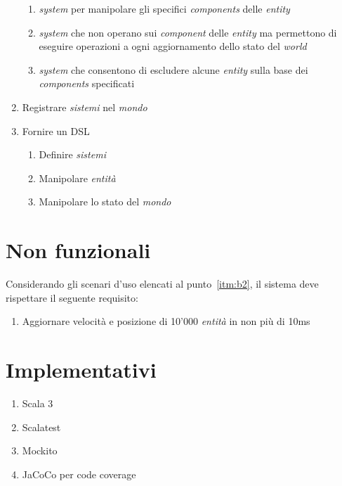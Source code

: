\begin{enumerate}[label=\textbf{\ref{sec:funzionali}.\arabic*}]
    \begin{enumerate}[label=\textbf{\ref{itm:f7}.\arabic*}]
        \item \label{itm:ff7} \textit{system} per manipolare gli specifici \textit{components} delle \textit{entity}
        \item \label{itm:ff10} \textit{system} che non operano sui \textit{component} delle \textit{entity} ma permettono di eseguire operazioni a ogni aggiornamento dello stato del \textit{world}
        \item \label{itm:ff11} \textit{system} che consentono di escludere alcune \textit{entity} sulla base dei \textit{components} specificati
    \end{enumerate}
    \item \label{itm:f8} Registrare \textit{sistemi} nel \textit{mondo}
    \item \label{itm:f9} Fornire un DSL
    \begin{enumerate}[label=\textbf{\ref{itm:f9}.\arabic*}]
        \item \label{itm:ff12} Definire \textit{sistemi}
        \item \label{itm:ff13} Manipolare \textit{entità}
        \item \label{itm:ff14} Manipolare lo stato del \textit{mondo}
    \end{enumerate}
\end{enumerate}


\section{Non funzionali}\label{sec:non-funzionali}
Considerando gli scenari d'uso elencati al punto~\ref{itm:b2}, il sistema deve rispettare il seguente requisito:
\begin{enumerate}[label=\textbf{\ref{sec:non-funzionali}.\arabic*}]
    \item \label{itm:nf1} Aggiornare velocità e posizione di 10'000 \textit{entità} in non più di 10ms
\end{enumerate}


\section{Implementativi}\label{sec:implementativi}
\begin{enumerate}[label=\textbf{\ref{sec:implementativi}.\arabic*}]
    \item \label{itm:i1} Scala 3
    \item \label{itm:i2} Scalatest
    \item \label{itm:i2} Mockito
    \item \label{itm:i3} JaCoCo per code coverage
\end{enumerate}
